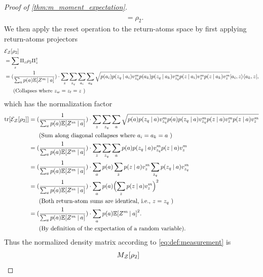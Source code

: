 \documentclass{article}
\DeclarePairedDelimiter{\bra}{\langle}{\rvert} %
\DeclarePairedDelimiter{\ket}{\lvert}{\rangle} %
\DeclarePairedDelimiter{\paren}{\lparen}{\rparen} %
\DeclarePairedDelimiter{\bparen}{[}{]} %
\newcommand{\E}{\mathbb{E}} %
\newcommand{\bfunc}[2]{#1\bparen*{#2}} %
\newcommand{\given}[1][]{\:#1\vert\:}
\begin{document}
\begin{proof}[Proof of \cref{thm:m_moment_expectation}]
\begin{align}
% 
\\&= \rho_2 \label{eq:rho_2}.
\end{align}
% 
We then apply the reset operation to the return-atoms space by first applying return-atoms projectors 
% 
\begin{align}
&\bfunc{\mathcal{E}_{\mathcal{Z}}}{\rho_2}
\\&= \sum_{z} \Pi_z \rho_2 \Pi^{\dagger}_z
\\&= (\frac{1}{\sum_{a} p(a) \bfunc{\mathbb{E}}{Z^{m} \given a}}) \cdot \sum_{z} \sum_{z_q} \sum_{a_i} \sum_{a_k} \sqrt{p(a_i) p(z_q \given a_i) v_{z_q}^{m} p(a_k) p(z_q \given a_k) v_{z_q}^{m} p(z \given a_i) v_{z}^{m} p(z \given a_k) v_{z}^{m}} \ket{a_i, z}\bra{a_k, z},
\\&~~~~~\textrm{(Collapses where}~ z_w = z_t = z ~\textrm{)}\nonumber
\end{align}
% 
which has the normalization factor
% 
\begin{align}
\bfunc{\textrm{tr}}{\bfunc{\mathcal{E}_{\mathcal{Z}}}{\rho_2}}
&= (\frac{1}{\sum_{a} p(a) \bfunc{\mathbb{E}}{Z^{m} \given a}}) \cdot \sum_{z} \sum_{z_q} \sum_{a} \sqrt{p(a) p(z_q \given a) v_{z_q}^{m} p(a) p(z_q \given a) v_{z_q}^{m} p(z \given a) v_{z}^{m} p(z \given a) v_{z}^{m}}
\\&~~~~~\textrm{(Sum along diagonal collapses where}~ a_i = a_k = a ~\textrm{)}\nonumber
\\&= (\frac{1}{\sum_{a} p(a) \bfunc{\mathbb{E}}{Z^{m} \given a}}) \cdot \sum_{z} \sum_{z_q} \sum_{a} p(a) p(z_q \given a) v_{z_q}^{m} p(z \given a) v_{z}^{m}
\\&= (\frac{1}{\sum_{a} p(a) \bfunc{\mathbb{E}}{Z^{m} \given a}}) \cdot \sum_{a} p(a) \sum_{z} p(z \given a) v_{z}^{m} \sum_{z_q} p(z_q \given a) v_{z_q}^{m}
\\&= (\frac{1}{\sum_{a} p(a) \bfunc{\mathbb{E}}{Z^{m} \given a}}) \cdot \sum_{a} p(a) \paren[\Big]{\sum_{z} p(z \given a) v_{z}^{m}}^2
\\&~~~~~\textrm{(Both return-atom sums are identical, i.e.,}~ z = z_q ~\textrm{)}\nonumber
\\&= (\frac{1}{\sum_{a} p(a) \bfunc{\mathbb{E}}{Z^{m} \given a}}) \cdot \sum_{a} p(a) \bfunc{\mathbb{E}}{Z^{m} \given a}^2.
\\&~~~~~\textrm{(By definition of the expectation of a random variable)}.\nonumber
\end{align}
% 
Thus the normalized density matrix according to \cref{eq:def:measurement} is
% 
\begin{align}
&\bfunc{M_{\mathcal{Z}}}{\rho_2}

\end{align}
\end{proof}
\end{document}
